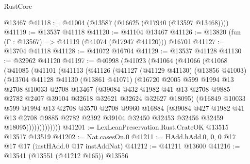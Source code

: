 \begin{lexlean}{RustCore}
\begin{coremodule}
    @13467
@41118 := @41004 (@13587 (@16625 (@17940 (@13597 @13468))))
@41119 := @13537 @41118
@41120 := @41104 @13467
@41126 := @13820 (fun (Γ : @13567) => @41119 (@41074 (@17947 @41120))) @16701
@41127 := @13704 @41118
@41128 := @41072 @16704
@41129 := @13537 @41128
@41130 := @32962 @41120
@41197 := @40998
    (@41023
      (@41064
        (@41066
          (@41068
            (@41085
              (@41101
                (@41113
                  (@41126
                    (@41127
                      (@41129 @41130)
                      (@13856 @41003)
                      (@13704
                        @41128
                        @41130
                        (@13861 @41071)
                        (@16720
                          @2005
                          @599
                          @1994
                          @13
                          @2708
                          @10033
                          @2708
                          @13467
                          (@39084
                            @432
                            @1982
                            @41
                            @13
                            @2708
                            @9885
                            @2782
                            @2407
                            @39104
                            @32618
                            @32621
                            @32624
                            @32627
                            @18095)
                          (@16849
                            @10033
                            @599
                            @1994
                            @13
                            @2708
                            @3570
                            @2708
                            @9960
                            @16884
                            (@39084
                              @427
                              @1982
                              @41
                              @13
                              @2708
                              @9885
                              @2782
                              @2392
                              @39104
                              @32450
                              @32453
                              @32456
                              @32459
                              @18095)))))))))))))
@41201 := LexLeanPreservation.Rust.CrateOK @13515 @13517 @13519
@41202 := Nat.casesOn.{0}
@41211 := HAdd.hAdd.{0, 0, 0} @17 @17 @17 (instHAdd.{0} @17 instAddNat)
@41212 := @41211 @13600
@41216 := @13541 (@13551 (@41212 @165)) @13556

\end{coremodule}
\end{lexlean}
